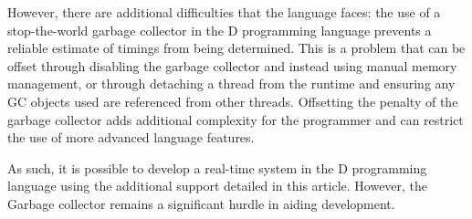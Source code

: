\par\bigskip\noindent
However, there are additional difficulties that the 
language faces: the use of a stop-the-world garbage collector in the 
D programming language prevents a reliable estimate of timings from being determined. 
This is a problem that can be offset through disabling the garbage collector 
and instead using manual memory management, or through detaching a thread from the 
runtime and ensuring any GC objects used are referenced from other threads.
Offsetting the penalty of the garbage collector adds additional complexity for 
the programmer and can restrict the use of more advanced language features. 
\par\bigskip\noindent
As such, it is possible to develop a real-time system in the D programming 
language using the additional support detailed in this article. However, 
the Garbage collector remains a significant hurdle in aiding development.
